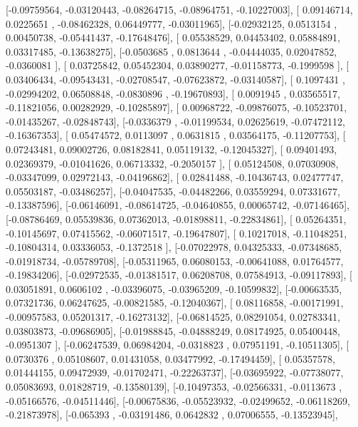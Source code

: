 \documentclass{article}
\begin{document}
       [-0.09759564, -0.03120443, -0.08264715, -0.08964751, -0.10227003],
       [ 0.09146714,  0.0225651 , -0.08462328,  0.06449777, -0.03011965],
       [-0.02932125,  0.0513154 ,  0.00450738, -0.05441437, -0.17648476],
       [ 0.05538529,  0.04453402,  0.05884891,  0.03317485, -0.13638275],
       [-0.0503685 ,  0.0813644 , -0.04444035,  0.02047852, -0.0360081 ],
       [ 0.03725842,  0.05452304,  0.03890277, -0.01158773, -0.1999598 ],
       [ 0.03406434, -0.09543431, -0.02708547, -0.07623872, -0.03140587],
       [ 0.1097431 , -0.02994202,  0.06508848, -0.0830896 , -0.19670893],
       [ 0.0091945 ,  0.03565517, -0.11821056,  0.00282929, -0.10285897],
       [ 0.00968722, -0.09876075, -0.10523701, -0.01435267, -0.02848743],
       [-0.0336379 , -0.01199534,  0.02625619, -0.07472112, -0.16367353],
       [ 0.05474572,  0.0113097 ,  0.0631815 ,  0.03564175, -0.11207753],
       [ 0.07243481,  0.09002726,  0.08182841,  0.05119132, -0.12045327],
       [ 0.09401493,  0.02369379, -0.01041626,  0.06713332, -0.2050157 ],
       [ 0.05124508,  0.07030908, -0.03347099,  0.02972143, -0.04196862],
       [ 0.02841488, -0.10436743,  0.02477747,  0.05503187, -0.03486257],
       [-0.04047535, -0.04482266,  0.03559294,  0.07331677, -0.13387596],
       [-0.06146091, -0.08614725, -0.04640855,  0.00065742, -0.07146465],
       [-0.08786469,  0.05539836,  0.07362013, -0.01898811, -0.22834861],
       [ 0.05264351, -0.10145697,  0.07415562, -0.06071517, -0.19647807],
       [ 0.10217018, -0.11048251, -0.10804314,  0.03336053, -0.1372518 ],
       [-0.07022978,  0.04325333, -0.07348685, -0.01918734, -0.05789708],
       [-0.05311965,  0.06080153, -0.00641088,  0.01764577, -0.19834206],
       [-0.02972535, -0.01381517,  0.06208708,  0.07584913, -0.09117893],
       [ 0.03051891,  0.0606102 , -0.03396075, -0.03965209, -0.10599832],
       [-0.00663535,  0.07321736,  0.06247625, -0.00821585, -0.12040367],
       [ 0.08116858, -0.00171991, -0.00957583,  0.05201317, -0.16273132],
       [-0.06814525,  0.08291054,  0.02783341,  0.03803873, -0.09686905],
       [-0.01988845, -0.04888249,  0.08174925,  0.05400448, -0.0951307 ],
       [-0.06247539,  0.06984204, -0.0318823 ,  0.07951191, -0.10511305],
       [ 0.0730376 ,  0.05108607,  0.01431058,  0.03477992, -0.17494459],
       [ 0.05357578,  0.01444155,  0.09472939, -0.01702471, -0.22263737],
       [-0.03695922, -0.07738077,  0.05083693,  0.01828719, -0.13580139],
       [-0.10497353, -0.02566331, -0.0113673 , -0.05166576, -0.04511446],
       [-0.00675836, -0.05523932, -0.02499652, -0.06118269, -0.21873978],
       [-0.065393  , -0.03191486,  0.0642832 ,  0.07006555, -0.13523945],
\end{document}
